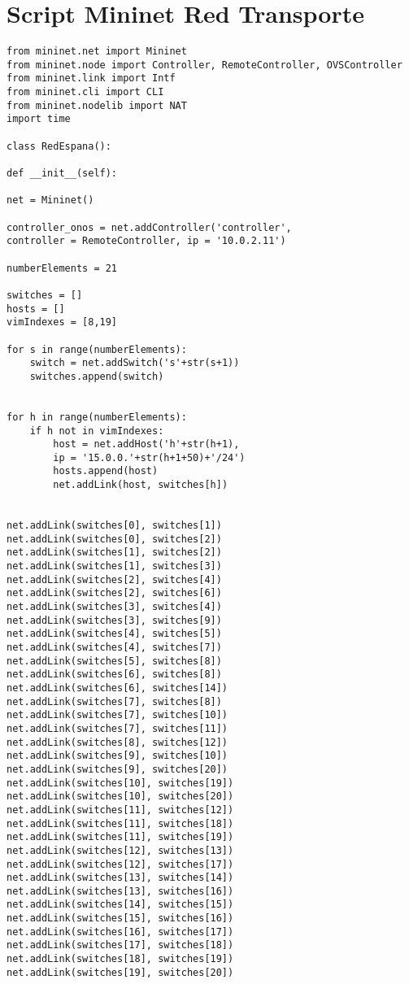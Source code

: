 \chapter{Script Mininet Red Transporte}

\begin{lstlisting}
from mininet.net import Mininet
from mininet.node import Controller, RemoteController, OVSController
from mininet.link import Intf
from mininet.cli import CLI
from mininet.nodelib import NAT
import time

class RedEspana():

def __init__(self):

net = Mininet()

controller_onos = net.addController('controller', 
controller = RemoteController, ip = '10.0.2.11')

numberElements = 21

switches = []
hosts = []
vimIndexes = [8,19]

for s in range(numberElements):
	switch = net.addSwitch('s'+str(s+1))
	switches.append(switch)


for h in range(numberElements):
	if h not in vimIndexes:
		host = net.addHost('h'+str(h+1), 
		ip = '15.0.0.'+str(h+1+50)+'/24')
		hosts.append(host)
		net.addLink(host, switches[h])


net.addLink(switches[0], switches[1])
net.addLink(switches[0], switches[2])
net.addLink(switches[1], switches[2])
net.addLink(switches[1], switches[3])
net.addLink(switches[2], switches[4])
net.addLink(switches[2], switches[6])
net.addLink(switches[3], switches[4])
net.addLink(switches[3], switches[9])
net.addLink(switches[4], switches[5])
net.addLink(switches[4], switches[7])
net.addLink(switches[5], switches[8])
net.addLink(switches[6], switches[8])
net.addLink(switches[6], switches[14])
net.addLink(switches[7], switches[8])
net.addLink(switches[7], switches[10])
net.addLink(switches[7], switches[11])
net.addLink(switches[8], switches[12])
net.addLink(switches[9], switches[10])
net.addLink(switches[9], switches[20])
net.addLink(switches[10], switches[19])
net.addLink(switches[10], switches[20])
net.addLink(switches[11], switches[12])
net.addLink(switches[11], switches[18])
net.addLink(switches[11], switches[19])
net.addLink(switches[12], switches[13])
net.addLink(switches[12], switches[17])
net.addLink(switches[13], switches[14])
net.addLink(switches[13], switches[16])
net.addLink(switches[14], switches[15])
net.addLink(switches[15], switches[16])
net.addLink(switches[16], switches[17])
net.addLink(switches[17], switches[18])
net.addLink(switches[18], switches[19])
net.addLink(switches[19], switches[20])


\end{lstlisting}
